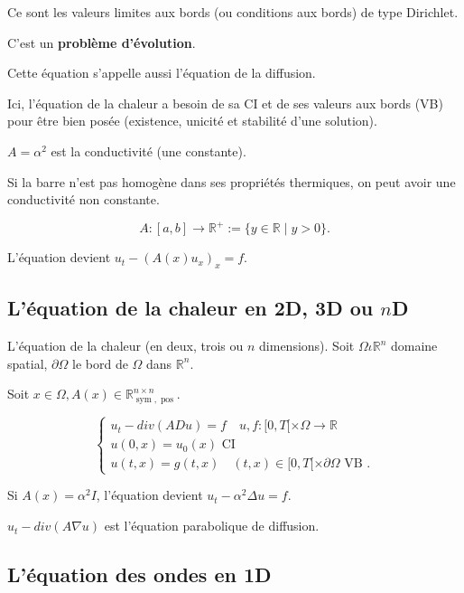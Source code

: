 \documentclass[french]{article}
\theoremstyle{definition}
\newcommand{\bg}{>}
\begin{document}
Ce sont les valeurs limites aux bords (ou conditions aux bords) de type Dirichlet.

C'est un \textbf{problème d'évolution}.


Cette équation s'appelle aussi l'équation de la diffusion.


Ici, l'équation de la chaleur a besoin de sa CI et de ses valeurs aux bords (VB) pour être bien posée (existence, unicité et stabilité d'une solution).

\(A = \alpha ^2\) est la conductivité (une constante).

Si la barre n'est pas homogène dans ses propriétés thermiques, on peut avoir une conductivité non constante.

\[A : [a,b] \longrightarrow \mathbb{R}^{+} := \{ y \in \mathbb{R} \mid y \bg 0 \}.\]

L'équation devient \(u_t - (A(x)u_x)_x = f\).

\subsection{L'équation de la chaleur en 2D, 3D ou \(n\)D}

L'équation de la chaleur (en deux, trois ou \(n\) dimensions). Soit \(\Omega \iota \mathbb{R}^n\) domaine spatial, \(\partial \Omega\) le bord de \(\Omega\) dans \(\mathbb{R}^n\).

Soit \(x \in \Omega, A(x) \in \mathbb{R}^{n \times n}_{\operatorname{sym}, \operatorname{pos}}\).

\begin{equation}\label{chaleur-nd}
  \begin{cases}
    u_t - div(A D u) = f \quad u,f : [0,T[ \times \Omega \longrightarrow \mathbb{R} \\
    u(0,x) = u_0(x) \text{ CI } \\
    u(t,x) = g(t,x) \quad (t,x) \in [0,T[ \times \partial \Omega \text{ VB }.
  \end{cases}
\end{equation}

Si \(A(x) = \alpha ^2 I\), l'équation devient \(u_t - \alpha ^2 \Delta u = f\).

\(u_t - div(A \nabla u)\) est l'équation parabolique de diffusion.

\subsection{L'équation des ondes en 1D}
\end{document}
